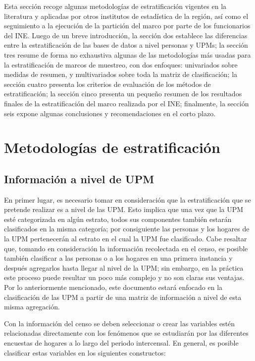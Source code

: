 \documentclass[
  12pt,
  spanish,
]{book}
\begin{document}
Esta sección recoge algunas metodologías de estratificación vigentes en la literatura y aplicadas por otros institutos de estadística de la región, así como el seguimiento a la ejecución de la partición del marco por parte de los funcionarios del INE. Luego de un breve introducción, la sección dos establece las diferencias entre la estratificación de las bases de datos a nivel personas y UPMs; la sección tres resume de forma no exhaustiva algunas de las metodologías más usadas para la estratificación de marcos de muestreo, con dos enfoques: univariados sobre medidas de resumen, y multivariados sobre toda la matriz de clasificación; la sección cuatro presenta los criterios de evaluación de los métodos de estratificación; la sección cinco presenta un pequeño resumen de los resultados finales de la estratificación del marco realizada por el INE; finalmente, la sección seis expone algunas conclusiones y recomendaciones en el corto plazo.

\hypertarget{metodologuxedas-de-estratificaciuxf3n}{%
\section{Metodologías de estratificación}\label{metodologuxedas-de-estratificaciuxf3n}}

\hypertarget{informaciuxf3n-a-nivel-de-upm}{%
\subsection{Información a nivel de UPM}\label{informaciuxf3n-a-nivel-de-upm}}

En primer lugar, es necesario tomar en consideración que la estratificación que se pretende realizar es a nivel de las UPM. Esto implica que una vez que la UPM esté categorizada en algún estrato, todos sus componentes también estarán clasificados en la misma categoría; por consiguiente las personas y los hogares de la UPM pertenecerán al estrato en el cual la UPM fue clasificado. Cabe resaltar que, tomando en consideración la información recolectada en el censo, es posible también clasificar a las personas o a los hogares en una primera instancia y después agregarlos hasta llegar al nivel de la UPM; sin embargo, en la práctica este proceso puede resultar un poco más complejo y no son claras sus ventajas. Por lo anteriormente mencionado, este documento estará enfocado en la clasificación de las UPM a partir de una matriz de información a nivel de esta misma agregación.

Con la información del censo se deben seleccionar o crear las variables estén relacionadas directamente con los fenómenos que se estudiarán por las diferentes encuestas de hogares a lo largo del periodo intercensal. En general, es posible clasificar estas variables en los siguientes constructos:
\end{document}
